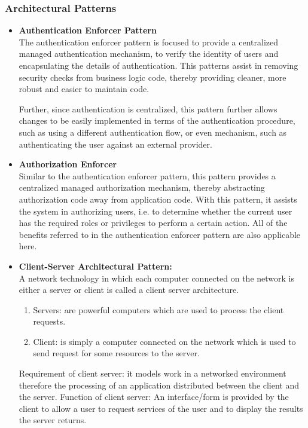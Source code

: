 \documentclass[a4paper,10pt]{article}
\begin{document}
\subsubsection{Architectural Patterns}
	\begin{itemize}
		\item \textbf{Authentication Enforcer Pattern} \\
		The authentication enforcer pattern is focused to provide a centralized managed authentication mechanism, to verify the identity of users and encapsulating the details of authentication. This patterns assist in removing security checks from business logic code, thereby providing cleaner, more robust and easier to maintain code.
		
		Further, since authentication is centralized, this pattern further allows changes to be easily implemented in terms of the authentication procedure, such as using a different authentication flow, or even mechanism, such as authenticating the user against an external provider.
	
		\item \textbf{Authorization Enforcer} \\
		Similar to the authentication enforcer pattern, this pattern provides a centralized managed authorization mechanism, thereby abstracting authorization code away from application code.  With this pattern, it assists the system in authorizing users, i.e. to determine whether the current user has the required roles or privileges to perform a certain action. All of the benefits referred to in the authentication enforcer pattern are also applicable here.
	
		\item \textbf{Client-Server Architectural Pattern:}\\
			A network technology in which each computer connected on the network is either a server or client is called a client server architecture.
			\begin{enumerate}
				\item Servers: are powerful computers which are used to process the client requests.
				\item Client: is simply a computer connected on the network which is used to send request for some resources to the server.
			\end{enumerate}
			Requirement of client server: it models work in a networked environment therefore the processing of an application distributed between the client and the server.
			Function of client server: An interface/form is provided by the client to allow a user to request services of the user and to display the results the server returns.
	

\end{itemize}
\end{document}

